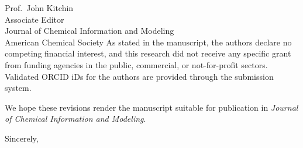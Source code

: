 \documentclass[11pt]{letter}
\begin{document}
\begin{letter}{Prof.\ John Kitchin\\
Associate Editor\\
Journal of Chemical Information and Modeling\\
American Chemical Society}
As stated in the manuscript, the authors declare no competing financial interest, and this research did not receive any specific grant from funding agencies in the public, commercial, or not-for-profit sectors. Validated ORCID iDs for the authors are provided through the submission system.

We hope these revisions render the manuscript suitable for publication in \textit{Journal of Chemical Information and Modeling}.

\closing{Sincerely,}

\end{letter}
\end{document}

